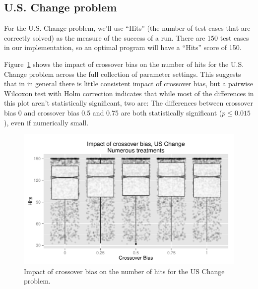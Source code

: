 \documentclass{sig-alternate}
\begin{document}
%
%
%
%

\subsection{U.S. Change problem}

For the U.S. Change problem, we'll use ``Hits'' (the number of test cases that are correctly solved) as the measure of 
the success of a run. There are 150 test cases in our implementation, so an optimal program will have a ``Hits'' score 
of 150.

Figure~\ref{fig:USChange_Hits} shows the impact of crossover bias on the number of hits for the U.S. Change 
problem across the full collection of parameter settings. This suggests that in in general there is little consistent 
impact of crossover bias, but a pairwise Wilcoxon test with Holm correction indicates that while most of the 
differences in this plot aren't statistically significant, two are: The differences between crossover bias 0 and crossover 
bias 0.5 and 0.75 are both statistically significant ($p \leq 0.015$), even if numerically small.

\begin{figure}
\centering
\includegraphics[width=0.45 \textwidth]{Plots/US_change_hits.pdf}
\caption{Impact of crossover bias on the number of hits for the US Change problem.}
\label{fig:USChange_Hits}
\end{figure}

%
%
%
%
\end{document}
